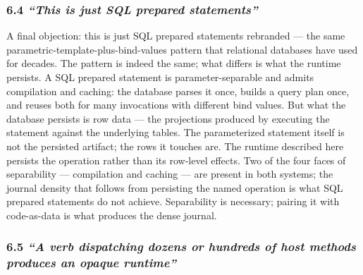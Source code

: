 \documentclass[
]{article}
\begin{document}
\subsubsection{\texorpdfstring{6.4 \emph{``This is just SQL prepared
statements''}}{6.4 ``This is just SQL prepared statements''}}\label{this-is-just-sql-prepared-statements}

A final objection: this is just SQL prepared statements rebranded ---
the same parametric-template-plus-bind-values pattern that relational
databases have used for decades. The pattern is indeed the same; what
differs is what the runtime persists. A SQL prepared statement is
parameter-separable and admits compilation and caching: the database
parses it once, builds a query plan once, and reuses both for many
invocations with different bind values. But what the database persists
is row data --- the projections produced by executing the statement
against the underlying tables. The parameterized statement itself is not
the persisted artifact; the rows it touches are. The runtime described
here persists the operation rather than its row-level effects. Two of
the four faces of separability --- compilation and caching --- are
present in both systems; the journal density that follows from
persisting the named operation is what SQL prepared statements do not
achieve. Separability is necessary; pairing it with code-as-data is what
produces the dense journal.

\subsubsection{\texorpdfstring{6.5 \emph{``A verb dispatching dozens or
hundreds of host methods produces an opaque
runtime''}}{6.5 ``A verb dispatching dozens or hundreds of host methods produces an opaque runtime''}}\label{a-verb-dispatching-dozens-or-hundreds-of-host-methods-produces-an-opaque-runtime}
\end{document}
